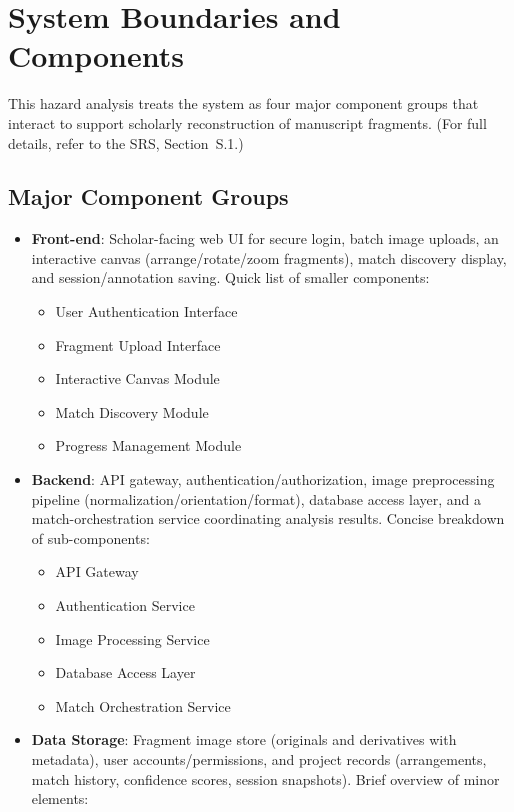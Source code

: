 \documentclass{article}
\begin{document}
\section{System Boundaries and Components}

This hazard analysis treats the system as four major component groups that interact to support scholarly reconstruction of manuscript fragments. (For full details, refer to the SRS, Section~S.1.)

\subsection*{Major Component Groups}
\begin{itemize}
  \item \textbf{Front-end}: Scholar-facing web UI for secure login, batch image uploads, an interactive canvas (arrange/rotate/zoom fragments), match discovery display, and session/annotation saving. Quick list of smaller components:
  \begin{itemize} 
    \item User Authentication Interface
    \item Fragment Upload Interface
    \item Interactive Canvas Module
    \item Match Discovery Module
    \item Progress Management Module
  \end{itemize}
  \item \textbf{Backend}: API gateway, authentication/authorization, image preprocessing pipeline (normalization/orientation/format), database access layer, and a match-orchestration service coordinating analysis results. Concise breakdown of sub-components:
   \begin{itemize} 
    \item API Gateway
    \item Authentication Service
    \item Image Processing Service
    \item Database Access Layer
    \item Match Orchestration Service
   \end{itemize}
  \item \textbf{Data Storage}: Fragment image store (originals and derivatives with metadata), user accounts/permissions, and project records (arrangements, match history, confidence scores, session snapshots). Brief overview of minor elements:
  \begin{itemize} 

\end{itemize}
\end{itemize}
\end{document}
